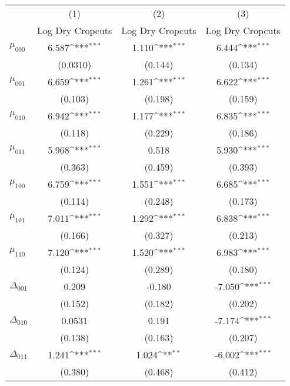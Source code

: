 {
\def\sym#1{\ifmmode^{#1}\else\(^{#1}\)\fi}
\begin{tabular}{l*{3}{c}}
\hline\hline
          &\multicolumn{1}{c}{(1)}&\multicolumn{1}{c}{(2)}&\multicolumn{1}{c}{(3)}\\
          &\multicolumn{1}{c}{Log Dry Cropcuts}&\multicolumn{1}{c}{Log Dry Cropcuts}&\multicolumn{1}{c}{Log Dry Cropcuts}\\
\hline
$\mu_{000}$&    6.587\sym{***}&    1.110\sym{***}&    6.444\sym{***}\\
          & (0.0310)         &  (0.144)         &  (0.134)         \\
$\mu_{001}$&    6.659\sym{***}&    1.261\sym{***}&    6.622\sym{***}\\
          &  (0.103)         &  (0.198)         &  (0.159)         \\
$\mu_{010}$&    6.942\sym{***}&    1.177\sym{***}&    6.835\sym{***}\\
          &  (0.118)         &  (0.229)         &  (0.186)         \\
$\mu_{011}$&    5.968\sym{***}&    0.518         &    5.930\sym{***}\\
          &  (0.363)         &  (0.459)         &  (0.393)         \\
$\mu_{100}$&    6.759\sym{***}&    1.551\sym{***}&    6.685\sym{***}\\
          &  (0.114)         &  (0.248)         &  (0.173)         \\
$\mu_{101}$&    7.011\sym{***}&    1.292\sym{***}&    6.838\sym{***}\\
          &  (0.166)         &  (0.327)         &  (0.213)         \\
$\mu_{110}$&    7.120\sym{***}&    1.520\sym{***}&    6.983\sym{***}\\
          &  (0.124)         &  (0.289)         &  (0.180)         \\
$\Delta_{001}$&    0.209         &   -0.180         &   -7.050\sym{***}\\
          &  (0.152)         &  (0.182)         &  (0.202)         \\
$\Delta_{010}$&   0.0531         &    0.191         &   -7.174\sym{***}\\
          &  (0.138)         &  (0.163)         &  (0.207)         \\
$\Delta_{011}$&    1.241\sym{***}&    1.024\sym{**} &   -6.002\sym{***}\\
          &  (0.380)         &  (0.468)         &  (0.412)         \\

\end{tabular}}
